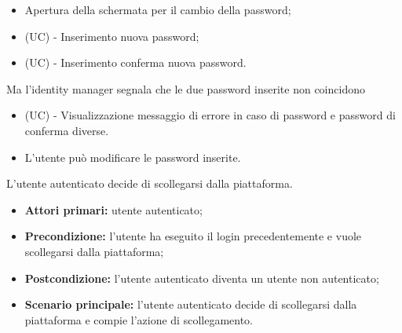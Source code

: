 \begin{itemize}
\begin{enumerate}
\begin{itemize}
			\item Apertura della schermata per il cambio della password;
			\item (UC) - Inserimento nuova password;
			\item (UC) - Inserimento conferma nuova password.
		\end{itemize}
		Ma l'identity manager segnala che le due password inserite non coincidono
		\begin{itemize}
			\item (UC) - Visualizzazione messaggio di errore in caso di password e password di conferma diverse.
			\item L'utente può modificare le password inserite.
		\end{itemize}
	\end{enumerate}
\end{itemize}

L'utente autenticato decide di scollegarsi dalla piattaforma.
\begin{itemize}
    \item \textbf{Attori primari:} utente autenticato;
    \item \textbf{Precondizione:} l'utente ha eseguito il login precedentemente e vuole scollegarsi dalla piattaforma;
    \item \textbf{Postcondizione:} l'utente autenticato diventa un utente non autenticato;
    \item \textbf{Scenario principale:} l'utente autenticato decide di scollegarsi dalla piattaforma e compie l'azione di scollegamento.
\end{itemize}